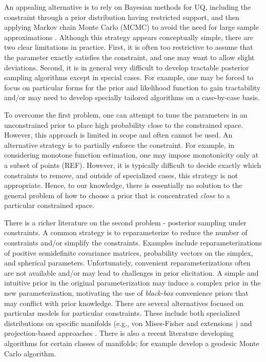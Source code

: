\documentclass[10pt,fleqn]{article}
\DeclareMathOperator{\1}{\mathbbm{1}} \DeclareMathOperator{\bigO}{\mc O}
\begin{document}
An appealing alternative is to rely on Bayesian
methods for UQ, including the constraint through a prior distribution
having restricted support, and then applying Markov chain Monte Carlo
(MCMC) to avoid the need for large sample approximations \citep{gelfand1992bayesian}. Although 
this strategy appears conceptually simple, there are two clear limitations
in practice.  First, it is often too restrictive to assume that the parameter
exactly satisfies the constraint, and one may want to allow slight deviations.
Second, it is in general very difficult to 
develop tractable posterior sampling algorithms except in special cases.
For example, one may be forced to focus on particular forms for the prior
and likelihood function to gain tractability and/or may need to develop
specially tailored algorithms on a case-by-case basis.  

To overcome the first problem, one can attempt to tune the parameters in an
unconstrained prior to place high probability close to the constrained space.
However, this approach is limited in scope and often cannot be used.
An alternative strategy is to partially enforce the constraint.  For example, 
in considering monotone function estimation, one may impose monotonicity only at 
a subset of points (REF).  However, it is typically difficult to decide exactly which constraints to remove, and 
outside of specialized cases, this strategy is not appropriate.  Hence, to our 
knowledge, there is essentially no solution to the general problem of how to choose a prior
that is concentrated {\em close} to a particular constrained space.  

There is a richer literature on the second problem - posterior sampling under constraints.  
A common strategy is to reparameterize to reduce the number of constraints and/or simplify the constraints.  
Examples include reparameterizations of positive semidefinite covariance
matrices, probability vectors on the simplex, and spherical parameters.
Unfortunately, convenient reparameterizations often are not available and/or may
lead to challenges in prior elicitation.  A simple and intuitive prior in the original parameterization
may induce a complex prior in the new parameterization, motivating the use of
{\em black-box} convenience priors that may conflict with prior knowledge.  There are several 
alternatives focused on particular models for particular constraints.  These include both 
specialized distributions on specific manifolds (e.g., von Mises-Fisher and extensions \citep{khatri1977mises,hoff2009simulation}) and projection-based approaches \citep{lin2014monogp}.  
There is also a recent literature developing algorithms for certain classes of manifolds; for example \cite{byrne2013geodesic} develop a geodesic Monte Carlo algorithm.
\end{document}

